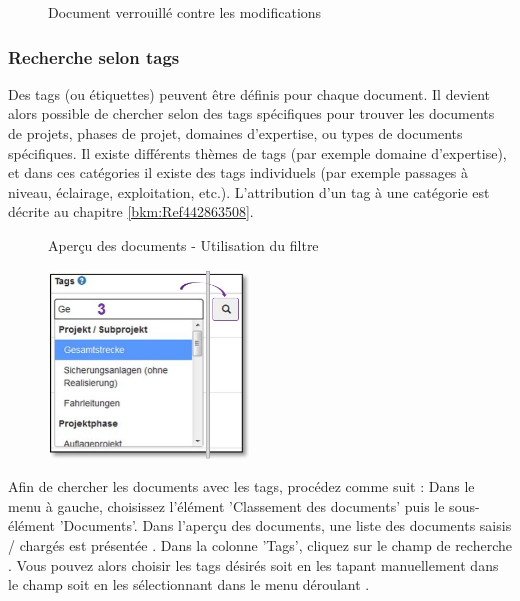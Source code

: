 \begin{figure}[H]
\caption{Document verrouillé contre les modifications}
\end{figure}

\subsubsection{Recherche selon tags}
\label{bkm:Ref442275849}

Des tags (ou étiquettes) peuvent être définis pour chaque document. Il devient alors possible de chercher selon des tags spécifiques pour trouver les documents de projets, phases de projet, domaines d'expertise, ou types de documents spécifiques. Il existe différents thèmes de tags (par exemple domaine d'expertise), et dans ces catégories il existe des tags individuels (par exemple passages à niveau, éclairage, exploitation, etc.). L'attribution d'un tag à une catégorie est décrite au chapitre \ref{bkm:Ref442863508}.

\begin{figure}[H]
\caption{Aperçu des documents - Utilisation du filtre}
\end{figure}

\pagebreak

\begin{figure}
\vspace{-10pt}
\includegraphics[height=50mm]{../chapters/11_Dokumentenablage/pictures/11-2-8_DokTagHinzufuegen.jpg}
\end{figure}
Afin de chercher les documents avec les tags, procédez comme suit : 
Dans le menu à gauche, choisissez l'élément 'Classement des documents' puis le sous-élément 'Documents'. Dans l'aperçu des documents, une liste des documents saisis / chargés est présentée . Dans la colonne 'Tags', cliquez sur le champ de recherche . Vous pouvez alors choisir les tags désirés soit en les tapant manuellement dans le champ soit en les sélectionnant dans le menu déroulant .

